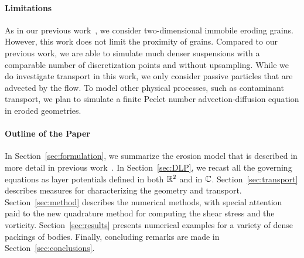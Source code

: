 \documentclass{jfm}
\begin{document}
\paragraph{Limitations}
As in our previous work~\citep{qua-moo2018}, we consider two-dimensional
immobile eroding grains. However, this work does not limit the proximity
of  grains. Compared to our previous work, we are able to simulate much
denser suspensions with a comparable number of discretization points and
without upsampling.  While we do investigate transport in this work, we
only consider passive particles that are advected by the flow.  To model
other physical processes, such as contaminant transport, we plan to
simulate a finite Peclet number advection-diffusion equation in eroded
geometries.

\paragraph{Outline of the Paper}
In Section~\ref{sec:formulation}, we summarize the erosion model that is
described in more detail in previous work~\citep{qua-moo2018}.  In
Section~\ref{sec:DLP}, we recast all the governing equations as layer
potentials defined in both ${\mathbb{R}}^2$ and in ${\mathbb{C}}$.
Section~\ref{sec:transport} describes measures for characterizing the
geometry and transport. Section~\ref{sec:method} describes the numerical
methods, with special attention paid to the new quadrature method for
computing the shear stress and the vorticity.  Section~\ref{sec:results}
presents numerical examples for a variety of dense packings of bodies.
Finally, concluding remarks are made in Section~\ref{sec:conclusions}.

\end{document}

